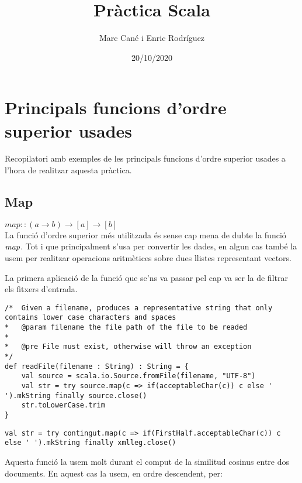 \documentclass{report}
\begin{document}
\title{Pràctica Scala}
\author{Marc Cané i Enric Rodríguez}
\date{20/10/2020}
\maketitle

\newpage
\tableofcontents

\newpage
\chapter{Principals funcions d'ordre superior usades}

Recopilatori amb exemples de les principals funcions d'ordre superior usades a l'hora de realitzar aquesta pràctica.

\newpage

\section{Map}

$ map :: (a \rightarrow b) \rightarrow [a] \rightarrow [b] $ \\

La funció d'ordre superior més utilitzada és sense cap mena de dubte la funció $ \emph{map} $. Tot i que principalment s'usa per convertir les dades, en algun cas també la usem per realitzar operacions aritmètices sobre dues llistes representant vectors.

La primera aplicació de la funció que se'ns va passar pel cap va ser la de filtrar els fitxers d'entrada.

\begin{lstlisting}[style=scalaHighlight]
/*	Given a filename, produces a representative string that only contains lower case characters and spaces
* 	@param filename the file path of the file to be readed
* 	
* 	@pre File must exist, otherwise will throw an exception
*/
def readFile(filename : String) : String = {
	val source = scala.io.Source.fromFile(filename, "UTF-8")
	val str = try source.map(c => if(acceptableChar(c)) c else ' ').mkString finally source.close()
	str.toLowerCase.trim
}
\end{lstlisting}

\begin{lstlisting}[style=scalaHighlight]
val str = try contingut.map(c => if(FirstHalf.acceptableChar(c)) c else ' ').mkString finally xmlleg.close()
\end{lstlisting}

Aquesta funció la usem molt durant el comput de la similitud cosinus entre dos documents. En aquest cas la usem, en ordre descendent, per:
\end{document}
